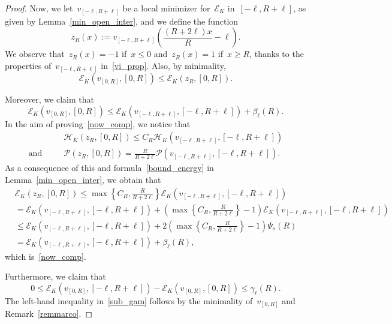 \documentclass[10pt,a4paper]{amsart}
\numberwithin{equation}{section}
\newcommand{\Ec}{\mathcal{E}_K}
\newcommand{\Hc}{\mathcal{H}_K}
\newcommand{\Pc}{\mathcal{P}}
\begin{document}
\begin{proof}
Now, we let~$v_{[-\ell, R+\ell]}$ be  a local minimizer
for~$\Ec$ in~$[-\ell, R+\ell]$, as given by
Lemma~\ref{min_open_inter}, and we
define the function
$$z_{R}(x):= v_{[-\ell, R+\ell]}\left( \frac{(R+2\ell)x}{R}-\ell \right).$$
We observe that~$z_{R} (x)=-1$ if~$x \leq 0$ and~$z_{R}(x)=1$ if~$x \geq R$, thanks to the properties of~$v_{[-\ell, R+\ell]}$
in~\eqref{vi_prop}.
Also, by minimality,
\begin{equation*}
\Ec(v_{[0,R]}, [0,R]) \leq \Ec(z_{R}, [0,R]).
\end{equation*}

Moreover, we claim that
\begin{equation}\label{now_comp}
\Ec(v_{[0,R]}, [0,R]) \leq \Ec(v_{[-\ell,R+\ell]}, [-\ell,R+\ell])+ \beta_{\ell}(R).
\end{equation}
In the aim of proving~\eqref{now_comp}, we notice that
\begin{eqnarray*}
&&\Hc(z_R, [0,R]) \le  C_R \Hc(v_{[-\ell, R+\ell]}, [-\ell, R+\ell])
\\{\mbox{and}}\quad &&
\Pc(z_R, [0,R]) =\frac{R}{R+2\ell}\Pc(v_{[-\ell, R+\ell]}, [-\ell, R+\ell]).
\end{eqnarray*}
As a consequence of this and formula~\eqref{bound_energy}
in Lemma~\ref{min_open_inter}, we obtain that
\begin{equation*}
\begin{split}
&\Ec(z_R, [0,R]) 
\le  \max\left\{C_R, \frac{R}{R+2\ell}\right\}\Ec(v_{[-\ell, R+\ell]}, [-\ell, R+\ell])
\\
&= \Ec(v_{[-\ell, R+\ell]}, [-\ell, R+\ell]) + \left( \max\left\{C_R, \frac{R}{R+2\ell}\right\}-1 \right)\Ec(v_{[-\ell, R+\ell]}, [-\ell, R+\ell]) \\
&\leq \Ec(v_{[-\ell, R+\ell]}, [-\ell, R+\ell]) + 2 \left( \max\left\{C_R, \frac{R}{R+2\ell}\right\}-1 \right)\Psi_s(R) \\
&=\Ec(v_{[-\ell, R+\ell]}, [-\ell, R+\ell]) + \beta_{\ell}(R),
\end{split}
\end{equation*}
which is~\eqref{now_comp}.

Furthermore, we claim that
\begin{equation}\label{sub_gam}
0 \leq \Ec (v_{[0,R]}, [-\ell, R+\ell])- \Ec (v_{[0,R]}, [0,R])\leq  \gamma_{\ell}(R).
\end{equation}
The left-hand inequality in~\eqref{sub_gam}
follows by the minimality of~$v_{[0,R]}$ and
Remark~\ref{remmarco}.


\end{proof}
\end{document}
